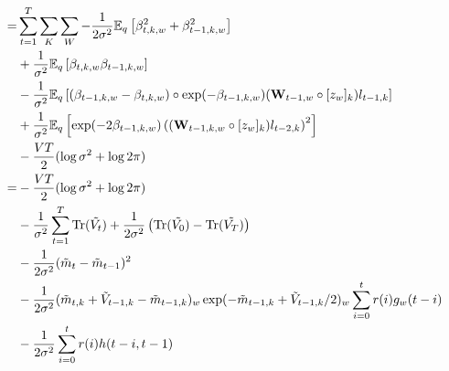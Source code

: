 \begin{align}
\hspace{-80pt} & \\  \nonumber
= & \sum_{t=1}^T \sum_K \sum_W
   - \frac{1}{2 \sigma^2} \expectq{ \beta_{t,k,w}^2 + \beta_{t-1,k,w}^2 } \\
    & + \frac{1}{\sigma^2} \expectq{ \beta_{t,k,w} \beta_{t-1,k,w} } \notag \\
    & - \frac{1}{\sigma^2} \expectq{ (\beta_{t-1,k,w} - \beta_{t,k,w}) \circ \exp(-\beta_{t-1,k,w}) (\W_{t-1,w} \circ [ z_w ]_k) l_{t-1,k} } \notag \\
    & + \frac{1}{\sigma^2} \expectq{ \exp(-2 \beta_{t-1,k,w}) \left( (\W_{t-1,k,w} \circ [ z_w ]_k ) l_{t-2,k} \right)^2 } \notag \\
    & - \frac{VT}{2} (\log \sigma^2 + \log 2 \pi) \notag \\
 = & - \frac{VT}{2} (\log \sigma^2 + \log 2 \pi) \notag \\  \nonumber
  & - \frac{1}{\sigma^2} \sum_{t=1}^T \tr(\tilde{V_t}) + \frac{1}{2 \sigma^2} \left(\tr(\tilde{V_0}) - \tr(\tilde{V_T}) \right) \notag \\  \nonumber
  & - \frac{1}{2 \sigma^2} (\mv_t - \mv_{t-1})^2 \nonumber \\ 
  & - \frac{1}{2 \sigma^2} (\mv_{t,k} + \vv_{t-1, k} - \mv_{t-1,k})_w \exp(-\mv_{t-1,k} + \vv_{t-1,k} / 2)_w \sum_{i=0}^t r(i) g_w(t-i) \label{eq:b_nexp_b} \\
  & - \frac{1}{2 \sigma^2} \sum_{i=0}^t r(i) h(t - i, t-1) \nonumber
\end{align}
